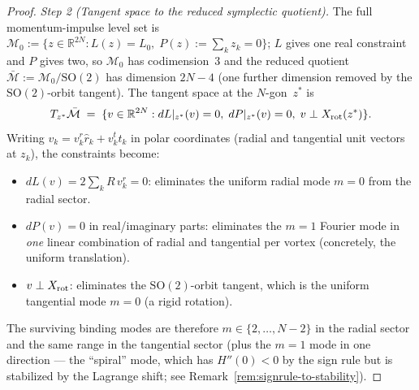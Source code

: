 \begin{proof}
\emph{Step 2 (Tangent space to the reduced symplectic quotient).}
The full momentum-impulse level set is
$\mathcal{M}_0 := \{z \in \mathbb{R}^{2N} : L(z) = L_0,\;
P(z) := \sum_k z_k = 0\}$; $L$ gives one real constraint and
$P$ gives two, so $\mathcal{M}_0$ has codimension~$3$ and the
reduced quotient $\bar{\mathcal{M}} := \mathcal{M}_0/\mathrm{SO}(2)$
has dimension $2N - 4$ (one further dimension removed by
the $\mathrm{SO}(2)$-orbit tangent).  The tangent space at the
$N$-gon~$z^*$ is
\begin{equation}\label{eq:tangent-space}
  T_{z^*}\bar{\mathcal{M}}
  \;=\; \{v \in \mathbb{R}^{2N} :
    dL|_{z^*}(v) = 0,\;
    dP|_{z^*}(v) = 0,\;
    v \perp X_{\rm rot}(z^*)\}.
\end{equation}
Writing $v_k = v_k^r \hat r_k + v_k^t \hat t_k$ in polar
coordinates (radial and tangential unit vectors at $z_k$),
the constraints become:
\begin{itemize}[leftmargin=*,topsep=0pt,itemsep=0pt]
\item $dL(v) = 2\sum_k R\, v_k^r = 0$: eliminates the
  uniform radial mode $m = 0$ from the radial sector.
\item $dP(v) = 0$ in real/imaginary parts: eliminates
  the $m = 1$ Fourier mode in \emph{one} linear combination
  of radial and tangential per vortex (concretely, the uniform
  translation).
\item $v \perp X_{\rm rot}$: eliminates the $\mathrm{SO}(2)$-orbit
  tangent, which is the uniform tangential mode $m = 0$
  (a rigid rotation).
\end{itemize}
The surviving binding modes are therefore
$m \in \{2, \ldots, N-2\}$ in the radial sector and the same
range in the tangential sector (plus the $m = 1$ mode in one
direction --- the ``spiral'' mode, which has $H''(0) < 0$
by the sign rule but is stabilized by the Lagrange shift;
see Remark~\ref{rem:signrule-to-stability}).


\end{proof}
